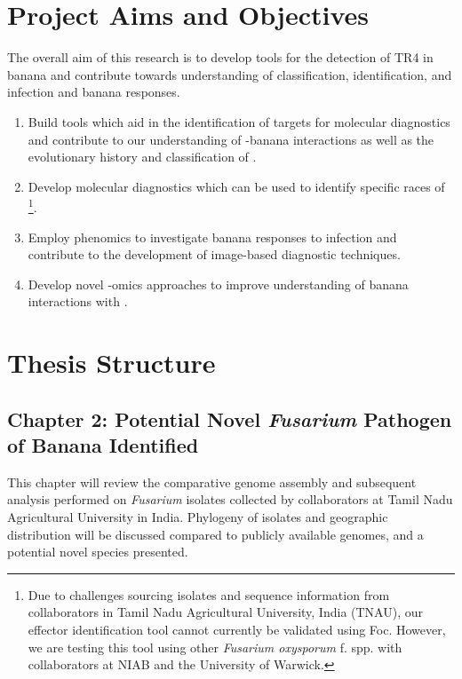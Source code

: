 \newpage
\section{Project Aims and Objectives}

The overall aim of this research is to develop tools for the detection of \Focub TR4 in banana and contribute towards understanding of \Focub classification, identification, and infection and banana responses. 

\begin{enumerate}
    \item Build tools which aid in the identification of targets for molecular diagnostics and contribute to our understanding of \Foc-banana interactions as well as the evolutionary history and classification of \Foc. 
    \item Develop molecular diagnostics which can be used to identify specific races of \Fo\footnote{Due to challenges sourcing isolates and sequence information from collaborators in Tamil Nadu Agricultural University, India (TNAU), our effector identification tool cannot currently be validated using Foc. However, we are testing this tool using other \textit{Fusarium oxysporum} f. spp. with collaborators at NIAB and the University of Warwick.}.
    \item Employ phenomics to investigate banana responses to \Foc infection and contribute to the development of image-based diagnostic techniques.  
    \item Develop novel -omics approaches to improve understanding of banana interactions with \Foc.  
\end{enumerate}

\newpage
\section{Thesis Structure}

\subsection{Chapter 2: Potential Novel \textit{Fusarium} Pathogen of Banana Identified} 

This chapter will review the comparative genome assembly and subsequent analysis performed on \textit{Fusarium} isolates collected by collaborators at Tamil Nadu Agricultural University in India. Phylogeny of isolates and geographic distribution will be discussed compared to publicly available genomes, and a potential novel species presented. 

